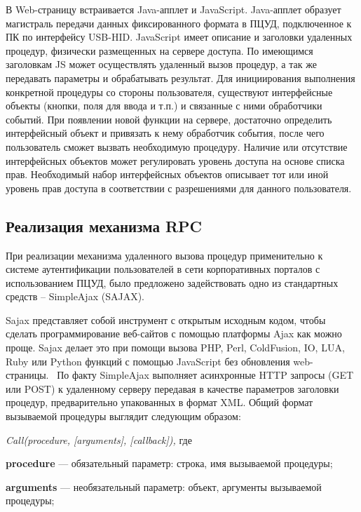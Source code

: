 В Web-страницу встраивается Java-апплет и JavaScript. Java-апплет образует
магистраль передачи данных фиксированного формата в ПЦУД, подключенное к ПК по
интерфейсу USB-HID. JavaScript имеет описание и заголовки удаленных процедур,
физически размещенных на сервере доступа. По имеющимся заголовкам JS может
осуществлять удаленный вызов процедур, а так же передавать параметры и
обрабатывать результат. Для инициирования выполнения конкретной процедуры со
стороны пользователя, существуют интерфейсные объекты (кнопки, поля для ввода и
т.п.) и связанные с ними обработчики событий.
При появлении новой функции на сервере, достаточно определить интерфейсный
объект и привязать к нему обработчик события, после чего пользователь сможет
вызвать необходимую процедуру.
Наличие или отсутствие интерфейсных объектов может регулировать уровень доступа
на основе списка прав. Необходимый набор интерфейсных объектов описывает тот или
иной уровень прав доступа в соответствии с разрешениями для данного
пользователя.~\cite{art_rpc}

\subsection{Реализация механизма RPC}

При реализации механизма удаленного вызова процедур применительно к системе
аутентификации пользователей в сети корпоративных порталов с использованием
ПЦУД, было предложено задействовать одно из стандартных средств -- SimpleAjax
(SAJAX).

Sajax представляет собой инструмент с открытым исходным кодом, чтобы сделать
программирование веб-сайтов с помощью платформы Ajax как можно проще. Sajax
делает это при помощи вызова PHP, Perl, ColdFusion, IO, LUA, Ruby или Python
функций с помощью JavaScript без обновления web-страницы.~\cite{sajax} По факту
SimpleAjax выполняет асинхронные HTTP запросы (GET или POST) к удаленному
серверу передавая в качестве параметров заголовки процедур, предварительно
упакованных в формат XML. Общий формат вызываемой процедуры выглядит следующим
образом:

\begin{center}
  \textit{Call(procedure, [arguments], [callback]),} где 
 \end{center} 
 
 \textbf{procedure} --- обязательный параметр: строка, имя
 вызываемой процедуры;

\textbf{arguments} --- необязательный параметр: объект, аргументы вызываемой
процедуры;

